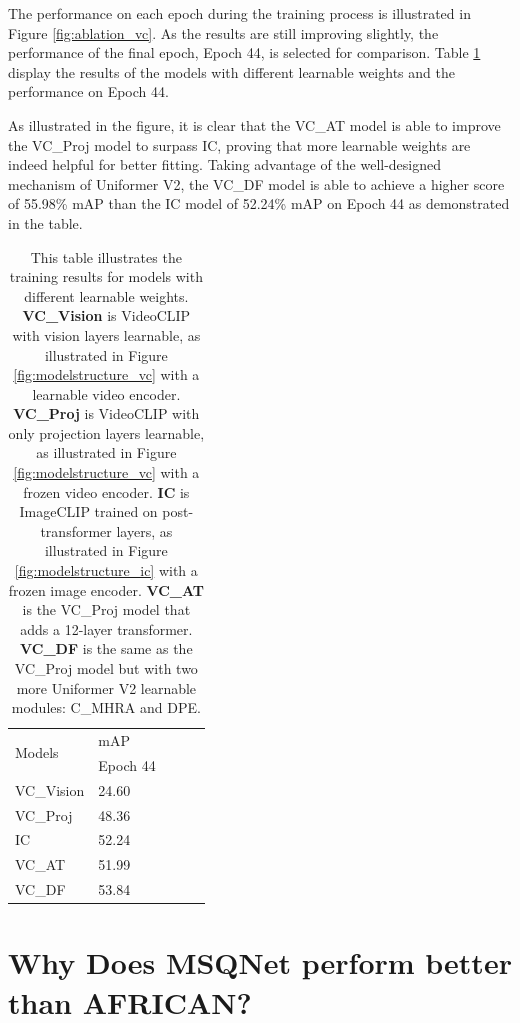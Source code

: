 The performance on each epoch during the training process is illustrated in Figure \ref{fig:ablation_vc}. As the results are still improving slightly, the performance of the final epoch, Epoch 44, is selected for comparison. Table \ref{tab:ablation_vc} display the results of the models with different learnable weights and the performance on Epoch 44.

As illustrated in the figure, it is clear that the VC\_AT model is able to improve the VC\_Proj model to surpass IC, proving that more learnable weights are indeed helpful for better fitting. Taking advantage of the well-designed mechanism of Uniformer V2, the VC\_DF model is able to achieve a higher score of 55.98\% mAP than the IC model of 52.24\% mAP on Epoch 44 as demonstrated in the table. 

\begin{table}[ht]
    \centering
    \caption[Training Results for Models with Different Learnable Weights] {This table illustrates the training results for models with different learnable weights. \textbf{VC\_Vision} is VideoCLIP with vision layers learnable, as illustrated in Figure \ref{fig:modelstructure_vc} with a learnable video encoder. \textbf{VC\_Proj} is VideoCLIP with only projection layers learnable, as illustrated in Figure \ref{fig:modelstructure_vc} with a frozen video encoder. \textbf{IC} is ImageCLIP trained on post-transformer layers, as illustrated in Figure \ref{fig:modelstructure_ic} with a frozen image encoder. \textbf{VC\_AT} is the VC\_Proj model that adds a 12-layer transformer. \textbf{VC\_DF} is the same as the VC\_Proj model but with two more Uniformer V2 learnable modules: C\_MHRA and DPE.}
    \label{tab:ablation_vc}
    \begin{tabular}{lllll}
        \toprule
        \multirow{2}{*}{Models} & mAP \\
        \cmidrule{2-2} 
        {} & Epoch 44 \\
        \midrule
        VC\_Vision & 24.60 \\
        VC\_Proj   & 48.36 \\
        IC         & 52.24 \\
        VC\_AT     & 51.99 \\
        VC\_DF     & 53.84 \\
        \bottomrule
    \end{tabular}
\end{table}

\section{Why Does MSQNet perform better than AFRICAN?}
\label{sec:discussion_msqnet}


